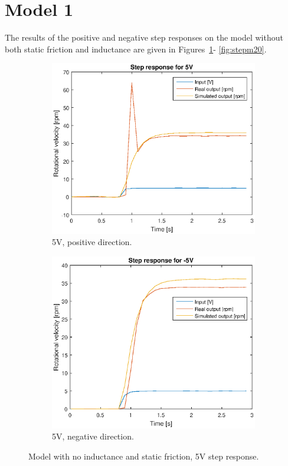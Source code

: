 \section*{Model 1}
The results of the positive and negative step responses on the model without
both static friction and inductance are given in Figures~\ref{fig:step5}-
\ref{fig:stepm20}.
\begin{figure}[H]
    \centering
    \begin{subfigure}[H]{0.48\textwidth}
    \includegraphics[width=\textwidth]{./img/testrig_5Vstep_no_i_no_fric.eps}
    \caption{5V, positive direction.}
    \label{fig:step5}
    \end{subfigure}
    \begin{subfigure}[H]{0.48\textwidth}
    \includegraphics[width=\textwidth]{./img/testrig_m5Vstep_no_i_no_fric.eps}
    \caption{5V, negative direction.}
    \label{fig:stepm5}
    \end{subfigure}
    \caption{Model with no inductance and static friction, 5V step response.}
\end{figure}
